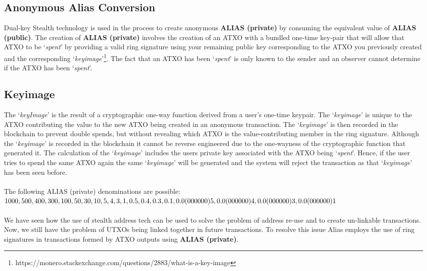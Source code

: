 \subsection{Anonymous Alias Conversion}
Dual-key Stealth technology is used in the process to create anonymous 
\textbf{ALIAS (private)} by consuming the equivalent value of \textbf{ALIAS (public)}. The 
creation of \textbf{ALIAS (private)} involves the creation of an ATXO with a 
bundled one-time key-pair that will allow that ATXO to be ‘\textit{spent}’ 
by providing a valid ring signature using your remaining public key 
corresponding to the ATXO you previously created and the corresponding 
‘\textit{keyimage}’\footnote{https://monero.stackexchange.com/questions/2883/what-is-a-key-image}. 
The fact that an ATXO has been ‘\textit{spent}’ is only known to the sender 
and an observer cannot determine if the ATXO has been ‘\textit{spent}’.



\subsection{Keyimage}
The ‘\textit{keyImage}’ is the result of a cryptographic one-way function derived
from a user’s one-time keypair. The ‘\textit{keyimage}’ is unique to the ATXO
contributing the value to the new ATXO being created in an anonymous
transaction. The ‘\textit{keyimage}’ is then recorded in the blockchain to prevent
double spends, but without revealing which ATXO is the value-contributing
member in the ring signature. Although the ‘\textit{keyimage}’ is recorded in the
blockchain it cannot be reverse engineered due to the one-wayness of the
cryptographic function that generated it. The calculation of the ‘\textit{keyimage}’
includes the users private key associated with the ATXO being ‘\textit{spent}’.
Hence, if the user tries to spend the same ATXO again the same ‘\textit{keyimage}’
will be generated and the system will reject the transaction as that
‘\textit{keyimage}’ has been seen before.
\\
\\
The following ALIAS (private) denominations are possible:
\\
$1000, 500, 400, 300, 100, 50, 30, 10, 5, 4, 3, 1, \\0.5, 0.4, 0.3, 0.1, 0.0(000000)5, 0.0(000000)4, 0.0(000000)3, 0.0(000000)1$
\\
\\
\noindent
We have seen how the use of stealth address tech can be used to solve the
problem of address re-use and to create un-linkable transactions. Now, we
still have the problem of UTXOs being linked together in future transactions.
To resolve this issue Alias employs the use of ring signatures in
transactions formed by ATXO outputs using \textbf{ALIAS (private)}.
